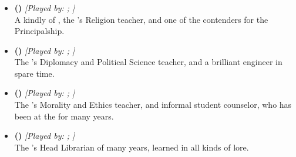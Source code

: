 \documentclass[blue]{GL2020}
\begin{document}
\subsubsection*{\pTech{}}
\begin{itemize}
    \item \textbf{\cBeetle{\full} (\cBeetle{\MYcharpronouns})} \textit{[Played by: \cBeetle{\MYplayer}; \cBeetle{\MYplayerpronouns}]}\\ A kindly \cBeetle{\cleric} of \cTechGod{}, the \pSc{}'s Religion teacher, and one of the contenders for the Principalship.
    
    \item \textbf{\cChupInventor{\full} (\cChupInventor{\MYcharpronouns})} \textit{[Played by: \cChupInventor{\MYplayer}; \cChupInventor{\MYplayerpronouns}]}\\ The \pSc{}'s Diplomacy and Political Science teacher, and a brilliant engineer in \cChupInventor{\their} spare time.
    
    \item \textbf{\cEthics{\full} (\cEthics{\MYcharpronouns})} \textit{[Played by: \cEthics{\MYplayer}; \cEthics{\MYplayerpronouns}]}\\ The \pSc{}'s Morality and Ethics teacher, and informal student counselor, who has been at the \pSc{} for many years.
    
    \item \textbf{\cLibrarian{\full} (\cLibrarian{\MYcharpronouns})} \textit{[Played by: \cLibrarian{\MYplayer}; \cLibrarian{\MYplayerpronouns}]}\\ The \pSc{}'s Head Librarian of many years, learned in all kinds of lore.
\end{itemize}
\end{document}
